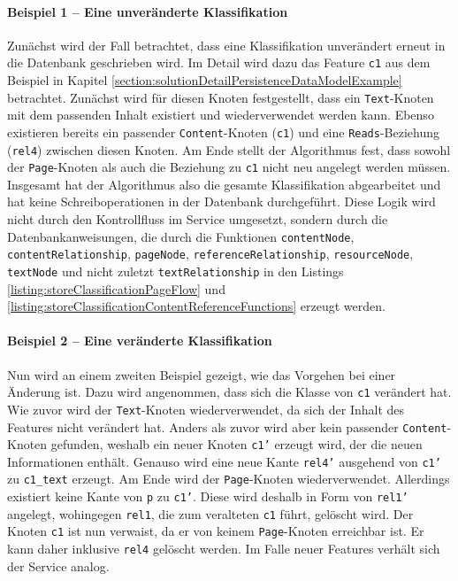     \paragraph*{Beispiel 1 -- Eine unveränderte Klassifikation}
    Zunächst wird der Fall betrachtet, dass eine Klassifikation unverändert erneut in die Datenbank geschrieben wird.
    Im Detail wird dazu das Feature \texttt{c1} aus dem Beispiel in Kapitel
    \ref{section:solutionDetailPersistenceDataModelExample} betrachtet.
    Zunächst wird für diesen Knoten festgestellt,
    dass ein \texttt{Text}-Knoten mit dem passenden Inhalt existiert und wiederverwendet werden kann.
    Ebenso existieren bereits ein passender \texttt{Content}-Knoten (\texttt{c1}) und eine \texttt{Reads}-Beziehung (\texttt{rel4}) zwischen diesen Knoten.
    Am Ende stellt der Algorithmus fest, dass sowohl der \texttt{Page}-Knoten als auch
    die Beziehung zu \texttt{c1} nicht neu angelegt werden müssen.
    Insgesamt hat der Algorithmus also die gesamte Klassifikation abgearbeitet
    und hat keine Schreiboperationen in der Datenbank durchgeführt.
    Diese Logik wird nicht durch den Kontrollfluss im Service umgesetzt,
    sondern durch die Datenbankanweisungen, die durch die Funktionen
    \texttt{contentNode},
    \texttt{contentRelationship},
    \texttt{pageNode},
    \texttt{referenceRelationship},
    \texttt{resourceNode},
    \texttt{textNode} und nicht zuletzt
    \texttt{textRelationship} in den Listings
    \ref{listing:storeClassificationPageFlow} und
    \ref{listing:storeClassificationContentReferenceFunctions}
    erzeugt werden.

    \paragraph*{Beispiel 2 -- Eine veränderte Klassifikation}
    Nun wird an einem zweiten Beispiel gezeigt,
    wie das Vorgehen bei einer Änderung ist.
    Dazu wird angenommen, dass sich die Klasse von \texttt{c1} verändert hat.
    Wie zuvor wird der \texttt{Text}-Knoten wiederverwendet,
    da sich der Inhalt des Features nicht verändert hat.
    Anders als zuvor wird aber kein passender \texttt{Content}-Knoten gefunden,
    weshalb ein neuer Knoten \texttt{c1'} erzeugt wird, der die neuen Informationen enthält.
    Genauso wird eine neue Kante \texttt{rel4'} ausgehend von \texttt{c1'} zu \texttt{c1\_text} erzeugt.
    Am Ende wird der \texttt{Page}-Knoten wiederverwendet.
    Allerdings existiert keine Kante von \texttt{p} zu \texttt{c1'}.
    Diese wird deshalb in Form von \texttt{rel1'} angelegt,
    wohingegen \texttt{rel1}, die zum veralteten \texttt{c1} führt, gelöscht wird.
    Der Knoten \texttt{c1} ist nun verwaist, da er von keinem \texttt{Page}-Knoten erreichbar ist.
    Er kann daher inklusive \texttt{rel4} gelöscht werden.
    Im Falle neuer Features verhält sich der Service analog.

